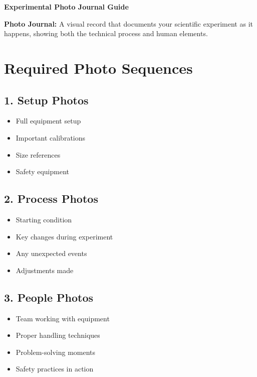 \documentclass[11pt]{article}
\begin{document}
\begin{center}
\LARGE\textbf{Experimental Photo Journal Guide}
\end{center}

\vspace{1em}

\begin{conceptbox}
\textbf{Photo Journal:} A visual record that documents your scientific experiment as it happens, showing both the technical process and human elements.
\end{conceptbox}

\section*{Required Photo Sequences}

\subsection*{1. Setup Photos}
\begin{itemize}[leftmargin=*]
    \item Full equipment setup
    \item Important calibrations
    \item Size references
    \item Safety equipment
\end{itemize}

\subsection*{2. Process Photos}
\begin{itemize}[leftmargin=*]
    \item Starting condition
    \item Key changes during experiment
    \item Any unexpected events
    \item Adjustments made
\end{itemize}

\subsection*{3. People Photos}
\begin{itemize}[leftmargin=*]
    \item Team working with equipment
    \item Proper handling techniques
    \item Problem-solving moments
    \item Safety practices in action
\end{itemize}
\end{document}
